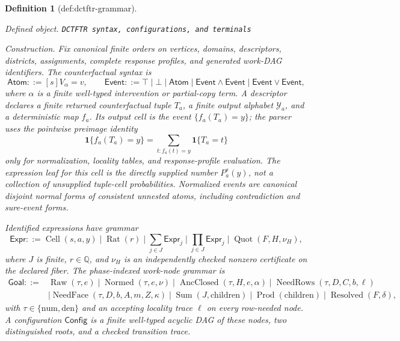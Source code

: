 \documentclass{article}
\newtheorem{definition}{Definition}
\begin{document}
\begin{definition}[def:dctftr-grammar]\label{def:dctftr-grammar}
\par\smallskip\noindent\emph{Defined object.} \texttt{DCTFTR syntax,\allowbreak{} configurations,\allowbreak{} and terminals}
\par\smallskip\noindent\emph{Construction.} Fix canonical finite orders on vertices, domains, descriptors, districts, assignments, complete response profiles, and generated work-DAG identifiers.  The counterfactual syntax is
\[
\mathsf{Atom}::=[s]V_\alpha=v,
\qquad
\mathsf{Event}::=\top\mid\bot\mid\mathsf{Atom}
\mid\mathsf{Event}\wedge\mathsf{Event}
\mid\mathsf{Event}\vee\mathsf{Event},
\]
where \(\alpha\) is a finite well-typed intervention or partial-copy term.  A descriptor declares a finite returned counterfactual tuple \(T_a\), a finite output alphabet \(\mathcal Y_a\), and a deterministic map \(f_a\).  Its output cell is the event \(\{f_a(T_a)=y\}\); the parser uses the pointwise preimage identity
\[
\mathbf 1\{f_a(T_a)=y\}
=\sum_{t:f_a(t)=y}\mathbf 1\{T_a=t\}
\tag{1}
\]
only for normalization, locality tables, and response-profile evaluation.  The expression leaf for this cell is the directly supplied number \(P_a^s(y)\), not a collection of unsupplied tuple-cell probabilities.  Normalized events are canonical disjoint normal forms of consistent unnested atoms, including contradiction and sure-event forms.

Identified expressions have grammar
\[
\mathsf{Expr}::=
\operatorname{Cell}(s,a,y)\mid\operatorname{Rat}(r)
\mid\sum_{j\in J}\mathsf{Expr}_j
\mid\prod_{j\in J}\mathsf{Expr}_j
\mid\operatorname{Quot}(F,H,\nu_H),
\]
where \(J\) is finite, \(r\in\mathbb Q\), and \(\nu_H\) is an independently checked nonzero certificate on the declared fiber.  The phase-indexed work-node grammar is
\[
\begin{split}
\mathsf{Goal}::={}&
\operatorname{Raw}(\tau,e)
\mid\operatorname{Normed}(\tau,e,\nu)
\mid\operatorname{AncClosed}(\tau,H,e,\alpha)
\mid\operatorname{NeedRows}(\tau,D,C,b,\ell)\\
&\mid\operatorname{NeedFace}(\tau,D,b,A,m,Z,\kappa)
\mid\operatorname{Sum}(J,\mathrm{children})
\mid\operatorname{Prod}(\mathrm{children})
\mid\operatorname{Resolved}(F,\delta),
\end{split}
\]
with \(\tau\in\{\mathrm{num},\mathrm{den}\}\) and an accepting locality trace \(\ell\) on every row-needed node.  A configuration \(\mathsf{Config}\) is a finite well-typed acyclic DAG of these nodes, two distinguished roots, and a checked transition trace.


\end{definition}
\end{document}
